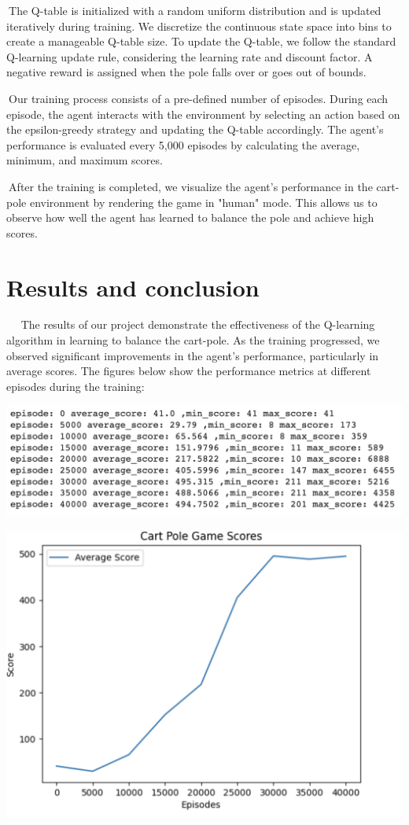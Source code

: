 \documentclass{article}
\begin{document}
$\>$The Q-table is initialized with a random uniform distribution and is updated iteratively during training. We discretize the continuous state space into bins to create a manageable Q-table size. To update the Q-table, we follow the standard Q-learning update rule, considering the learning rate and discount factor. A negative reward is assigned when the pole falls over or goes out of bounds.

$\>$Our training process consists of a pre-defined number of episodes. During each episode, the agent interacts with the environment by selecting an action based on the epsilon-greedy strategy and updating the Q-table accordingly. The agent's performance is evaluated every 5,000 episodes by calculating the average, minimum, and maximum scores.

$\>$After the training is completed, we visualize the agent's performance in the cart-pole environment by rendering the game in "human" mode. This allows us to observe how well the agent has learned to balance the pole and achieve high scores.

\section{Results and conclusion}

$\>$    $\>$   $\>$The results of our project demonstrate the effectiveness of the Q-learning algorithm in learning to balance the cart-pole. As the training progressed, we observed significant improvements in the agent's performance, particularly in average scores. The figures below show the performance metrics at different episodes during the training:
 
 
 
 
 \includegraphics[scale = 0.6]{image1}
 
  \includegraphics[scale = 0.4]{image2}
  
\end{document}
